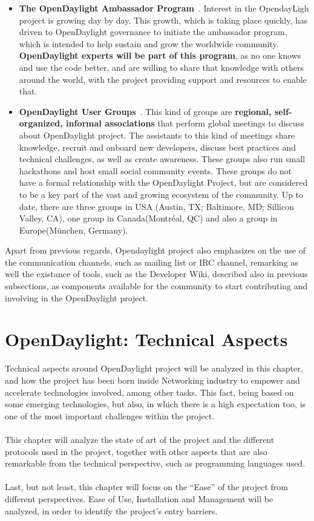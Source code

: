 \documentclass[a4paper, 12pt]{book}
\begin{document}
\begin{enumerate}
\begin{itemize}
\item{\textbf{The OpenDaylight Ambassador Program}~\cite{OpenDaylightAmbassadorProgram}}. Interest in the OpendayLigh project is growing day by day. This growth, which is taking place quickly, has driven to OpenDaylight governance to initiate the ambassador program, which is intended to help sustain and grow the worldwide community. \textbf{OpenDaylight experts will be part of this program}, as no one knows and use the code better, and are willing to share that knowledge with others around the world, with the project providing support and resources to enable that.
\item{\textbf{OpenDaylight User Groups}~\cite{OpenDaylightUserGroups}}. This kind of groups are \textbf{regional, self-organized, informal associations} that perform global meetings to discuss about OpenDaylight project. The assistants to this kind of meetings share knowledge, recruit and onboard new developers, discuss best practices and technical challenges, as well as create awareness. These groups also run small hackathons and host small social community events. These groups do not have a formal relationship with the OpenDaylight Project, but are considered to be a key part of the vast and growing ecosystem of the community. Up to date, there are three groups in USA (Austin, TX; Baltimore, MD; Sillicon Valley, CA), one group in Canada(Montréal, QC) and also a group in Europe(München, Germany).
\end{itemize}

Apart from previous regards, Opendaylight project also emphasizes on the use of the communication channels, such as mailing list or IRC channel, remarking as well the existance of tools, such as the Developer Wiki, described also in previous subsections, as components available for the community to start contributing and involving in the OpenDaylight project.
\end{enumerate}

\chapter{OpenDaylight: Technical Aspects}
\label{chap:odltechnical}
Technical aspects around OpenDaylight project will be analyzed in this chapter, and how the project has been born inside Networking industry to empower and accelerate technologies involved, among other tasks. This fact, being based on some emerging technologies, but also, in which there is a high expectation too, is one of the most important challenges within the project.\\
\\
This chapter will analyze the state of art of the project and the different protocols used in the project, together with other aspects that are also remarkable from the technical perspective, such as programming languages used.\\
\\
Last, but not least, this chapter will focus on the ``Ease'' of the project from different perspectives. Ease of Use, Installation and Management will be analyzed, in order to identify the project's entry barriers.
\end{document}
